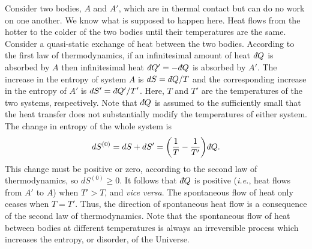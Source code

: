 Consider two bodies, $A$ and $A'$,
 which are in thermal contact but can do no work
on one another. We know what is supposed to happen here. Heat flows from the 
hotter to the colder of the two bodies until their temperatures are the same. 
Consider a quasi-static exchange of heat  between the two bodies. According to the
first law of thermodynamics, if an infinitesimal amount of heat $\,\dbar Q$ is
absorbed by $A$ then infinitesimal heat $\,\dbar Q' = - \,\dbar Q$ is absorbed
by $A'$. The increase in the entropy of system $A$ is $dS=\,\dbar Q/T$ and
the corresponding increase in the  entropy
of $A'$ is $dS' = \,\dbar Q'/T'$. Here, $T$ and $T'$ are the temperatures of the two
systems, respectively. Note that $\,\dbar Q$ is assumed to the sufficiently small
that the heat transfer does not substantially
modify the temperatures of either system. The change in entropy of the whole
system is
\begin{equation}
dS^{(0)} = dS + dS' = \left( \frac{1}{T}- \frac{1}{T'}\right)\dbar Q.
\end{equation}
 This change must be positive or zero, 
according to the second law of thermodynamics, so
$dS^{(0)} \geq 0$. It follows that $\, \dbar Q$ is positive ({\em i.e.}, heat flows from
$A'$ to $A$) when $T'>T$, and {\em vice versa}. The 
spontaneous flow of heat  only ceases when $T=T'$. Thus, the direction of
spontaneous heat flow is a consequence of the second law of thermodynamics.
 Note that the spontaneous flow of heat between bodies at different temperatures
is always an irreversible process which 
 increases the entropy, or disorder, of the
Universe. 

